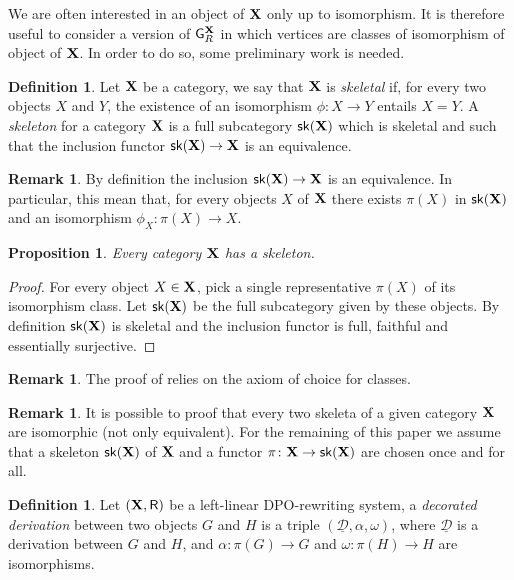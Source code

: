 \documentclass[a4paper]{article}
\def\R{\mathsf{R}}
\def\X{\textbf {\textup{X}}}
\newcommand{\ske}{\mathsf{sk}(\X)}
\newcommand{\dder}[1]{\mathscr{#1}}
\newcommand{\der}[1]{\underline{\dder{#1}}}
\def\gpo{\mathsf{G}^{\X}_R}
\newtheorem{proposition}[theorem]{Proposition}
\theoremstyle{definition}
\newtheorem{definition}[theorem]{Definition}
\newtheorem{remark}[theorem]{Remark}
\begin{document}
We are often interested in an object of $\X$ only up to isomorphism. It is therefore useful to consider a version of $\gpo$ in which vertices are classes of isomorphism of object of $\X$. In order to do so, some preliminary work is needed.

\begin{definition}\cite{mac2013categories}
Let $\X$ be a category, we say that  $\X$ is \emph{skeletal} if, for every two objects $X$ and $Y$, the existence of an isomorphism $\phi\colon X\to Y$ entails $X=Y$. A \emph{skeleton} for a category $\X$ is a full subcategory $\ske$ which is skeletal and such that the inclusion functor $\ske\to \X$ is an equivalence. 
\end{definition}

\begin{remark}
By definition the inclusion $\ske \to \X$ is an equivalence. In particular, this mean that, for every objects $X$ of $\X$ there exists $\pi(X)$ in $\ske$ and an isomorphism $\phi_X\colon \pi(X) \to X$.
\end{remark}

\begin{proposition}\label{prop:ske}
	Every category $\X$ has a skeleton. 
\end{proposition}
\begin{proof}
	For every object $X\in \X$, pick a single representative $\pi(X)$ of its isomorphism class. Let $\ske$ be the full subcategory given by these objects. By definition $\ske$ is skeletal and the inclusion functor is full, faithful and essentially surjective.\qedhere 
\end{proof}
\begin{remark}
	The proof of  relies on the axiom of choice for classes.
	\end{remark}
\begin{remark}
	It is possible to proof that every two skeleta of a given category $\X$ are isomorphic (not only equivalent). For the remaining of this paper we assume that a skeleton $\ske$ of $\X$ and a functor $\pi\colon \X\to \ske$ are chosen once and for all.
\end{remark}

\begin{definition}
	Let $(\X, \R)$ be a left-linear DPO-rewriting system, a \emph{decorated derivation} between two objects $G$ and $H$ is a triple $(\der{D}, \alpha, \omega)$, where $\der{D}$ is a derivation between $G$ and $H$, and $\alpha\colon \pi(G)\to G$ and $\omega\colon \pi(H)\to H$ are isomorphisms.
\end{definition}
\end{document}
